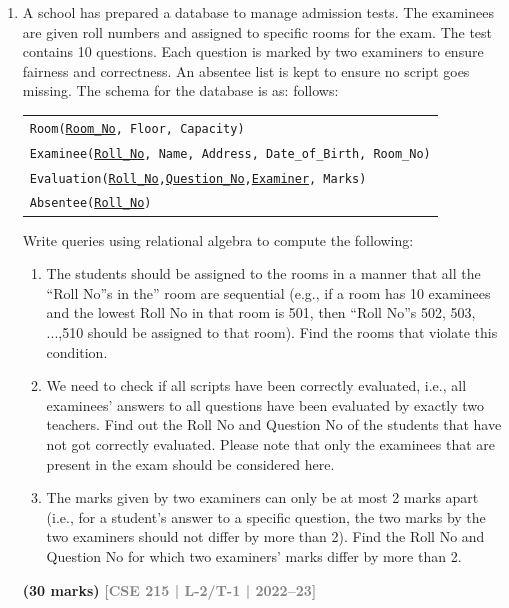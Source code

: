 \documentclass[12pt,a3paper]{article}
\newcommand{\yr}[1]{\hfill\textcolor{gray}{\small\textbf{[#1]}}}
\newcommand{\mk}[1]{\textcolor{orange!70!black}{\small\textbf{(#1 marks)}}}
\begin{document}
\begin{enumerate}
\item A school has prepared a database to manage admission tests. The examinees are given
roll numbers and assigned to specific rooms for the exam. The test contains 10 questions.
Each question is marked by two examiners to ensure fairness and correctness. An
absentee list is kept to ensure no script goes missing. The schema for the database is as:
follows:
\begin{center}
\begin{tabular}{l}
\texttt{Room(\underline{Room\_No}, Floor, Capacity)}\\
\texttt{Examinee(\underline{Roll\_No}, Name, Address, Date\_of\_Birth, Room\_No)}\\
\texttt{Evaluation(\underline{Roll\_No},\underline{Question\_No},\underline{Examiner}, Marks)}\\
\texttt{Absentee(\underline{Roll\_No})}
\end{tabular}
\end{center}
Write queries using relational algebra to compute the following:
\begin{enumerate}
\item The students should be assigned to the rooms in a manner that all the “Roll No”s in the”
room are sequential (e.g., if a room has 10 examinees and the lowest Roll No in that room
is 501, then “Roll No”s 502, 503, ...,510 should be assigned to that room). Find the
rooms that violate this condition.
\item We need to check if all scripts have been correctly evaluated, i.e., all examinees'
answers to all questions have been evaluated by exactly two teachers. Find out the Roll
No and Question No of the students that have not got correctly evaluated. Please note
that only the examinees that are present in the exam should be considered here.
\item The marks given by two examiners can only be at most 2 marks apart (i.e., for a
student's answer to a specific question, the two marks by the two examiners should not
differ by more than 2). Find the Roll No and Question No for which two examiners'
marks differ by more than 2.
\end{enumerate}
\mk{30} \yr{CSE 215 | L-2/T-1 | 2022--23}


\end{enumerate}
\end{document}
